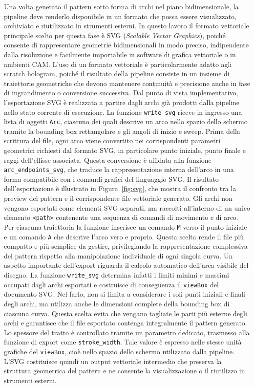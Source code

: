 \documentclass[a4paper,11pt,titlepage,twoside]{book}
\newcommand{\1}{\mathbf{1}}
\numberwithin{equation}{chapter}
\theoremstyle{plain}
\theoremstyle{definition}
\begin{document}
	Una volta generato il pattern sotto forma di archi nel piano bidimensionale, la pipeline deve renderlo disponibile in un formato che possa essere visualizzato, archiviato e riutilizzato in strumenti esterni. In questo lavoro il formato vettoriale principale scelto per questa fase è SVG (\emph{Scalable Vector Graphics}), poiché consente di rappresentare geometrie bidimensionali in modo preciso, indipendente dalla risoluzione e facilmente importabile in software di grafica vettoriale o in ambienti CAM\cite{W3CSVG2}. L’uso di un formato vettoriale è particolarmente adatto agli scratch hologram, poiché il risultato della pipeline consiste in un insieme di traiettorie geometriche che devono mantenere continuità e precisione anche in fase di ingrandimento o conversione successiva.
	Dal punto di vista implementativo, l’esportazione SVG è realizzata a partire dagli archi già prodotti dalla pipeline nello stato corrente di esecuzione. La funzione \texttt{write\_svg} riceve in ingresso una lista di oggetti \texttt{Arc}, ciascuno dei quali descrive un arco nello spazio dello schermo tramite la bounding box rettangolare e gli angoli di inizio e sweep.
	Prima della scrittura del file, ogni arco viene convertito nei corrispondenti parametri geometrici richiesti dal formato SVG, in particolare punto iniziale, punto finale e raggi dell’ellisse associata. Questa conversione è affidata alla funzione \texttt{arc\_endpoints\_svg}, che traduce la rappresentazione interna dell’arco in una forma compatibile con i comandi grafici del linguaggio SVG. Il risultato dell’esportazione è illustrato in Figura~\ref{fig:svg}, che mostra il confronto tra la preview del pattern e il corrispondente file vettoriale generato.
	Gli archi non vengono esportati come elementi SVG separati, ma raccolti all’interno di un unico elemento \texttt{<path>} contenente una sequenza di comandi di movimento e di arco. Per ciascuna traiettoria la funzione inserisce un comando \texttt{M} verso il punto iniziale e un comando \texttt{A} che descrive l’arco vero e proprio. Questa scelta rende il file più compatto e più semplice da gestire, privilegiando la rappresentazione complessiva del pattern rispetto alla manipolazione individuale di ogni singola curva.
	Un aspetto importante dell’export riguarda il calcolo automatico dell’area visibile del disegno. La funzione \texttt{write\_svg} determina infatti i limiti minimi e massimi occupati dagli archi esportati e costruisce di conseguenza il \texttt{viewBox} del documento SVG. Nel farlo, non si limita a considerare i soli punti iniziali e finali degli archi, ma utilizza anche le dimensioni complete della bounding box di ciascuna curva. Questa scelta evita che vengano tagliate le parti più esterne degli archi e garantisce che il file esportato contenga integralmente il pattern generato.
	Lo spessore del tratto è controllato tramite un parametro dedicato, trasmesso alla funzione di export come \texttt{stroke\_width}. Tale valore è espresso nelle stesse unità grafiche del \texttt{viewBox}, cioè nello spazio dello schermo utilizzato dalla pipeline. L’SVG costituisce quindi un output vettoriale intermedio che preserva la struttura geometrica del pattern e ne consente la visualizzazione o il riutilizzo in strumenti esterni.
	
\end{document}
